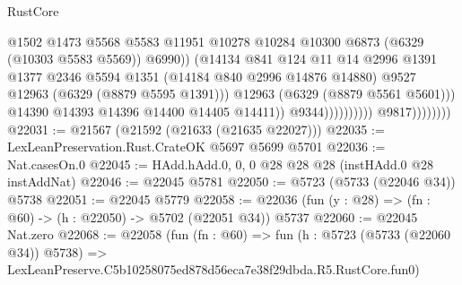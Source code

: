 \begin{lexlean}{RustCore}
\begin{coremodule}
                                                  @1502
                                                  @1473
                                                  @5568
                                                  @5583
                                                  @11951
                                                  @10278
                                                  @10284
                                                  @10300
                                                  @6873
                                                  (@6329 (@10303 @5583 @5569))
                                                  @6990))
                                              (@14134
                                                @841
                                                @124
                                                @11
                                                @14
                                                @2996
                                                @1391
                                                @1377
                                                @2346
                                                @5594
                                                @1351
                                                (@14184 @840 @2996 @14876 @14880)
                                                @9527
                                                @12963
                                                (@6329 (@8879 @5595 @1391)))
                                              @12963
                                              (@6329 (@8879 @5561 @5601)))
                                            @14390
                                            @14393
                                            @14396
                                            @14400
                                            @14405
                                            @14411))
                                        @9344))))))))))
                    @9817))))))))
@22031 := @21567 (@21592 (@21633 (@21635 @22027)))
@22035 := LexLeanPreservation.Rust.CrateOK @5697 @5699 @5701
@22036 := Nat.casesOn.{0}
@22045 := HAdd.hAdd.{0, 0, 0} @28 @28 @28 (instHAdd.{0} @28 instAddNat)
@22046 := @22045 @5781
@22050 := @5723 (@5733 (@22046 @34)) @5738
@22051 := @22045 @5779
@22058 := @22036 (fun (y : @28) => (fn : @60) -> (h : @22050) -> @5702 (@22051 @34)) @5737
@22060 := @22045 Nat.zero
@22068 := @22058
    (fun (fn : @60) =>
    fun (h : @5723 (@5733 (@22060 @34)) @5738) =>
    LexLeanPreserve.C5b10258075ed878d56eca7e38f29dbda.R5.RustCore.fun0)

\end{coremodule}
\end{lexlean}
